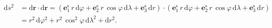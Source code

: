 \documentclass[a4paper,12pt]{book}
\newcommand{\diff}{\mathrm d}
\let\vec\mathbf
\begin{document}
%
\begin{equation}
\begin{split}
\diff s^2 &= \diff \vec r \cdot \diff \vec r = \left( \vec e_1^\mathrm{s} \, 
r \, \diff \varphi + \vec e_2^\mathrm{s} \, r \, \cos\varphi \, \diff \lambda 
+ \vec e_3^\mathrm{s} \, \diff r \right) \cdot \left( \vec e_1^\mathrm{s} \, 
r \, \diff \varphi + \vec e_2^\mathrm{s} \, r \, \cos\varphi \, \diff \lambda 
+ \vec e_3^\mathrm{s} \, \diff r \right)\\
%
&=  r^2 \, \diff\varphi^2 + r^2 \, \cos^2\varphi \, \diff\lambda^2 + \diff 
r^2{.}
\end{split}
\end{equation}







\printbibliography[title=Literat\'{u}ra]

\end{document}
